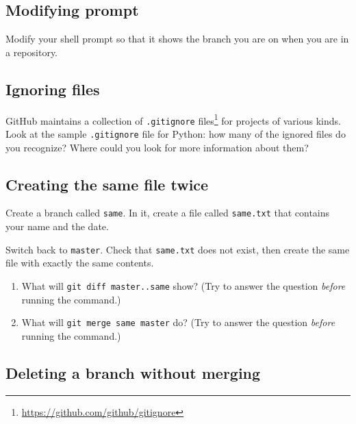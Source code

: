 \documentclass[
]{krantz}
\renewcommand{\href}[2]{#2\footnote{\url{#1}}}
\begin{document}
\hypertarget{git-advanced-ex-modify-prompt}{%
\subsection{Modifying prompt}\label{git-advanced-ex-modify-prompt}}

Modify your shell prompt so that it shows the branch you are on
when you are in a repository.

\hypertarget{git-advanced-ex-ignoring-files}{%
\subsection{Ignoring files}\label{git-advanced-ex-ignoring-files}}

GitHub maintains \href{https://github.com/github/gitignore}{a collection of \texttt{.gitignore} files}
for projects of various kinds.
Look at the sample \texttt{.gitignore} file for Python:
how many of the ignored files do you recognize?
Where could you look for more information about them?

\hypertarget{git-advanced-ex-create-twice}{%
\subsection{Creating the same file twice}\label{git-advanced-ex-create-twice}}

Create a branch called \texttt{same}.
In it, create a file called \texttt{same.txt} that contains your name and the date.

Switch back to \texttt{master}.
Check that \texttt{same.txt} does not exist,
then create the same file with exactly the same contents.

\begin{enumerate}
\def\labelenumi{\arabic{enumi}.}
\item
  What will \texttt{git\ diff\ master..same} show?
  (Try to answer the question \emph{before} running the command.)
\item
  What will \texttt{git\ merge\ same\ master} do?
  (Try to answer the question \emph{before} running the command.)
\end{enumerate}

\hypertarget{git-advanced-ex-delete-unmerged}{%
\subsection{Deleting a branch without merging}\label{git-advanced-ex-delete-unmerged}}
\end{document}
